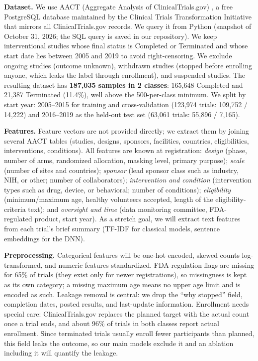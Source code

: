\documentclass[12pt]{article}
\begin{document}
\textbf{Dataset.} We use AACT (Aggregate Analysis of ClinicalTrials.gov) \cite{aact}, a free PostgreSQL database maintained by the Clinical Trials Transformation Initiative that mirrors all ClinicalTrials.gov \cite{ctgov} records. We query it from Python (snapshot of October 31, 2026; the SQL query is saved in our repository). We keep interventional studies whose final status is Completed or Terminated and whose start date lies between 2005 and 2019 to avoid right-censoring. We exclude ongoing studies (outcome unknown), withdrawn studies (stopped before enrolling anyone, which leaks the label through enrollment), and suspended studies. The resulting dataset has \textbf{187,035 samples in 2 classes}: 165,648 Completed and 21,387 Terminated (11.4\%), well above the 500-per-class minimum. We split by start year: 2005--2015 for training and cross-validation (123,974 trials: 109,752 / 14,222) and 2016--2019 as the held-out test set (63,061 trials: 55,896 / 7,165).

\textbf{Features.} Feature vectors are not provided directly; we extract them by joining several AACT tables (studies, designs, sponsors, facilities, countries, eligibilities, interventions, conditions). All features are known at registration: \emph{design} (phase, number of arms, randomized allocation, masking level, primary purpose); \emph{scale} (number of sites and countries); \emph{sponsor} (lead sponsor class such as industry, NIH, or other; number of collaborators); \emph{intervention and condition} (intervention types such as drug, device, or behavioral; number of conditions); \emph{eligibility} (minimum/maximum age, healthy volunteers accepted, length of the eligibility-criteria text); and \emph{oversight and time} (data monitoring committee, FDA-regulated product, start year). As a stretch goal, we will extract text features from each trial's brief summary (TF-IDF for classical models, sentence embeddings for the DNN).

\textbf{Preprocessing.} Categorical features will be one-hot encoded, skewed counts log-transformed, and numeric features standardized. FDA-regulation flags are missing for 65\% of trials (they exist only for newer registrations), so missingness is kept as its own category; a missing maximum age means no upper age limit and is encoded as such. Leakage removal is central: we drop the ``why stopped'' field, completion dates, posted results, and last-update information. Enrollment needs special care: ClinicalTrials.gov replaces the planned target with the actual count once a trial ends, and about 96\% of trials in both classes report actual enrollment. Since terminated trials usually enroll fewer participants than planned, this field leaks the outcome, so our main models exclude it and an ablation including it will quantify the leakage.
\end{document}
